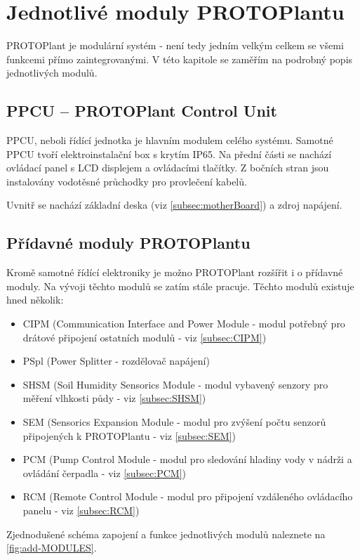 \chapter{Jednotlivé moduly PROTOPlantu}
PROTOPlant je modulární systém - není tedy jedním velkým celkem se všemi funkcemi přímo zaintegrovanými.
V této kapitole se zaměřím na podrobný popis jednotlivých modulů.

\section{PPCU -- PROTOPlant Control Unit}
PPCU, neboli řídící jednotka je hlavním modulem celého systému.
Samotné PPCU tvoří elektroinstalační box s krytím IP65.
Na přední části se nachází ovládací panel s LCD displejem a ovládacími tlačítky.
Z bočních stran jsou instalovány vodotěsné průchodky pro provlečení kabelů.

Uvnitř se nachází základní deska (viz \autoref{subsec:motherBoard}) a zdroj napájení.

\section{Přídavné moduly PROTOPlantu}
Kromě samotné řídící elektroniky je možno PROTOPlant rozšířit i o přídavné moduly. 
Na vývoji těchto modulů se zatím stále pracuje.
Těchto modulů existuje hned několik:

\begin{itemize}
    \item CIPM (Communication Interface and Power Module  - modul potřebný pro drátové připojení ostatních modulů - viz \autoref{subsec:CIPM})
    \item PSpl (Power Splitter - rozdělovač napájení)
    \item SHSM (Soil Humidity Sensorics Module - modul vybavený senzory pro měření vlhkosti půdy - viz \autoref{subsec:SHSM})
    \item SEM (Sensorics Expansion Module - modul pro zvýšení počtu senzorů připojených k PROTOPlantu - viz \autoref{subsec:SEM})
    \item PCM (Pump Control Module - modul pro sledování hladiny vody v nádrži a ovládání čerpadla - viz \autoref{subsec:PCM})
    \item RCM (Remote Control Module - modul pro připojení vzdáleného ovládacího panelu - viz \autoref{subsec:RCM})
\end{itemize}
Zjednodušené schéma zapojení a funkce jednotlivých modulů naleznete na \autoref{fig:add-MODULES}.


